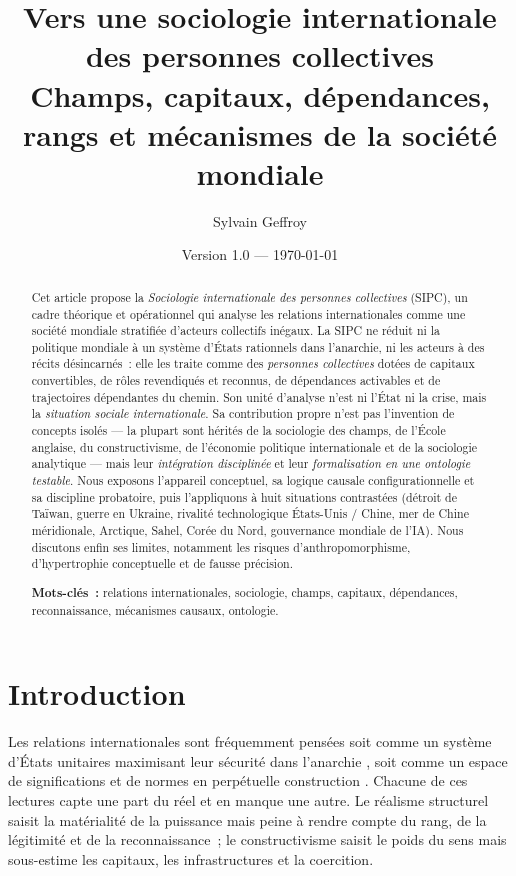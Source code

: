\documentclass[11pt,a4paper]{article}
\title{\textbf{Vers une sociologie internationale des personnes collectives}\\[0.4em]
\large Champs, capitaux, dépendances, rangs et mécanismes de la société mondiale}
\author{Sylvain Geffroy}
\date{Version 1.0 --- \today}
\begin{document}
\maketitle

\begin{abstract}
\noindent
Cet article propose la \emph{Sociologie internationale des personnes collectives} (SIPC), un
cadre théorique et opérationnel qui analyse les relations internationales comme une société
mondiale stratifiée d'acteurs collectifs inégaux. La SIPC ne réduit ni la politique mondiale à
un système d'États rationnels dans l'anarchie, ni les acteurs à des récits désincarnés~: elle
les traite comme des \emph{personnes collectives} dotées de capitaux convertibles, de rôles
revendiqués et reconnus, de dépendances activables et de trajectoires dépendantes du chemin.
Son unité d'analyse n'est ni l'État ni la crise, mais la \emph{situation sociale
internationale}. Sa contribution propre n'est pas l'invention de concepts isolés --- la plupart
sont hérités de la sociologie des champs, de l'École anglaise, du constructivisme, de
l'économie politique internationale et de la sociologie analytique --- mais leur
\emph{intégration disciplinée} et leur \emph{formalisation en une ontologie testable}. Nous
exposons l'appareil conceptuel, sa logique causale configurationnelle et sa discipline
probatoire, puis l'appliquons à huit situations contrastées (détroit de Taïwan, guerre en
Ukraine, rivalité technologique États-Unis / Chine, mer de Chine méridionale, Arctique, Sahel,
Corée du Nord, gouvernance mondiale de l'IA). Nous
discutons enfin ses limites, notamment les risques d'anthropomorphisme, d'hypertrophie
conceptuelle et de fausse précision.

\medskip
\noindent\textbf{Mots-clés~:} relations internationales, sociologie, champs, capitaux,
dépendances, reconnaissance, mécanismes causaux, ontologie.
\end{abstract}

\section{Introduction}

Les relations internationales sont fréquemment pensées soit comme un système d'États unitaires
maximisant leur sécurité dans l'anarchie \autocite{waltz1979,mearsheimer2001}, soit comme un
espace de significations et de normes en perpétuelle construction \autocite{wendt1999}. Chacune
de ces lectures capte une part du réel et en manque une autre. Le réalisme structurel saisit la
matérialité de la puissance mais peine à rendre compte du rang, de la légitimité et de la
reconnaissance~; le constructivisme saisit le poids du sens mais sous-estime les capitaux, les
infrastructures et la coercition.
\end{document}
